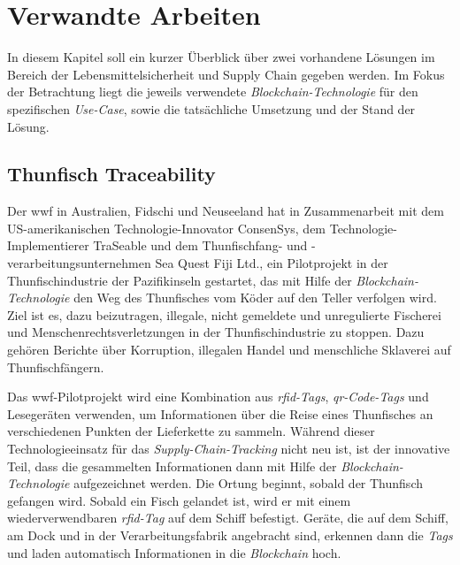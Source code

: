 \section{Verwandte Arbeiten} \label{sec:related-work}
In diesem Kapitel soll ein kurzer Überblick über zwei vorhandene Lösungen im Bereich der Lebensmittelsicherheit und Supply Chain gegeben werden. Im Fokus der Betrachtung liegt die jeweils verwendete \textit{Blockchain-Technologie} für den spezifischen \textit{Use-Case}, sowie die tatsächliche Umsetzung und der Stand der Lösung.

\subsection{Thunfisch Traceability}
Der \ac{wwf} in Australien, Fidschi und Neuseeland hat in Zusammenarbeit mit dem US-amerikanischen Technologie-Innovator ConsenSys, dem Technologie-Implementierer TraSeable und dem Thunfischfang- und -verarbeitungs\-unternehmen Sea Quest Fiji Ltd., ein Pilotprojekt in der Thunfischindustrie der Pazifikinseln gestartet, das mit Hilfe der \textit{Blockchain-Technologie} den Weg des Thunfisches vom \glqq Köder auf den Teller\grqq{} verfolgen wird. Ziel ist es, dazu beizutragen, illegale, nicht gemeldete und unregulierte Fischerei und Menschenrechtsverletzungen in der Thunfischindustrie zu stoppen. Dazu gehören Berichte über Korruption, illegalen Handel und menschliche Sklaverei auf Thunfischfängern.

Das \ac{wwf}-Pilotprojekt wird eine Kombination aus \textit{\ac{rfid}-Tags}, \textit{\ac{qr}-Code-Tags} und Lesegeräten verwenden, um Informationen über die Reise eines Thunfisches an verschiedenen Punkten der Lieferkette zu sammeln. Während dieser Technologieeinsatz für das \textit{Supply-Chain-Tracking} nicht neu ist, ist der innovative Teil, dass die gesammelten Informationen dann mit Hilfe der \textit{Blockchain-Technologie} aufgezeichnet werden. Die Ortung beginnt, sobald der Thunfisch gefangen wird. Sobald ein Fisch gelandet ist, wird er mit einem wiederverwendbaren \textit{\ac{rfid}-Tag} auf dem Schiff befestigt. Geräte, die auf dem Schiff, am Dock und in der Verarbeitungsfabrik angebracht sind, erkennen dann die \textit{Tags} und laden automatisch Informationen in die \textit{Blockchain} hoch. 

